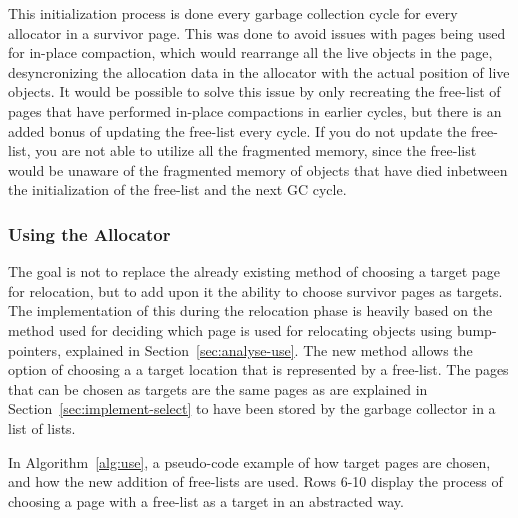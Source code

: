 This initialization process is done every garbage collection cycle for every allocator in a survivor page. This was done to avoid issues with pages being used for in-place compaction, which would rearrange all the live objects in the page, desyncronizing the allocation data in the allocator with the actual position of live objects. It would be possible to solve this issue by only recreating the free-list of pages that have performed in-place compactions in earlier cycles, but there is an added bonus of updating the free-list every cycle. If you do not update the free-list, you are not able to utilize all the fragmented memory, since the free-list would be unaware of the fragmented memory of objects that have died inbetween the initialization of the free-list and the next GC cycle.

\subsubsection{Using the Allocator}
\label{sec:implement-use}
The goal is not to replace the already existing method of choosing a target page for relocation, but to add upon it the ability to choose survivor pages as targets. The implementation of this during the relocation phase is heavily based on the method used for deciding which page is used for relocating objects using bump-pointers, explained in Section~\ref{sec:analyse-use}. The new method allows the option of choosing a  a target location that is represented by a free-list. The pages that can be chosen as targets are the same pages as are explained in Section~\ref{sec:implement-select} to have been stored by the garbage collector in a list of lists. 

In Algorithm~\ref{alg:use}, a pseudo-code example of how target pages are chosen, and how the new addition of free-lists are used. Rows 6-10 display the process of choosing a page with a free-list as a target in an abstracted way.

